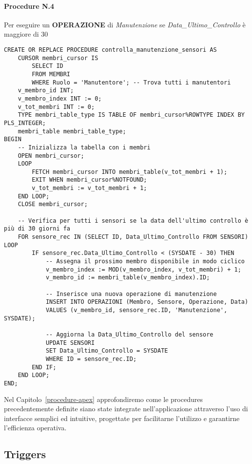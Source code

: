 \paragraph{Procedure N.4} Per eseguire un \textbf{OPERAZIONE} di \textit{Manutenzione} se \textit{Data\_Ultimo\_Controllo} è maggiore di 30
\begin{lstlisting}
CREATE OR REPLACE PROCEDURE controlla_manutenzione_sensori AS
    CURSOR membri_cursor IS
        SELECT ID
        FROM MEMBRI
        WHERE Ruolo = 'Manutentore'; -- Trova tutti i manutentori
    v_membro_id INT;
    v_membro_index INT := 0;
    v_tot_membri INT := 0;
    TYPE membri_table_type IS TABLE OF membri_cursor%ROWTYPE INDEX BY PLS_INTEGER;
    membri_table membri_table_type;
BEGIN
    -- Inizializza la tabella con i membri
    OPEN membri_cursor;
    LOOP
        FETCH membri_cursor INTO membri_table(v_tot_membri + 1);
        EXIT WHEN membri_cursor%NOTFOUND;
        v_tot_membri := v_tot_membri + 1;
    END LOOP;
    CLOSE membri_cursor;

    -- Verifica per tutti i sensori se la data dell'ultimo controllo è più di 30 giorni fa
    FOR sensore_rec IN (SELECT ID, Data_Ultimo_Controllo FROM SENSORI) LOOP
        IF sensore_rec.Data_Ultimo_Controllo < (SYSDATE - 30) THEN
            -- Assegna il prossimo membro disponibile in modo ciclico
            v_membro_index := MOD(v_membro_index, v_tot_membri) + 1;
            v_membro_id := membri_table(v_membro_index).ID;

            -- Inserisce una nuova operazione di manutenzione
            INSERT INTO OPERAZIONI (Membro, Sensore, Operazione, Data)
            VALUES (v_membro_id, sensore_rec.ID, 'Manutenzione', SYSDATE);

            -- Aggiorna la Data_Ultimo_Controllo del sensore
            UPDATE SENSORI
            SET Data_Ultimo_Controllo = SYSDATE
            WHERE ID = sensore_rec.ID;
        END IF;
    END LOOP;
END;
\end{lstlisting}

\vspace{0,4cm}

\noindent
Nel Capitolo~\ref{procedure-apex} approfondiremo come le procedures precedentemente definite siano state integrate nell'applicazione attraverso l'uso di interfacce semplici ed intuitive, progettate per facilitarne l'utilizzo e garantirne l'efficienza operativa.

\subsection{Triggers}

